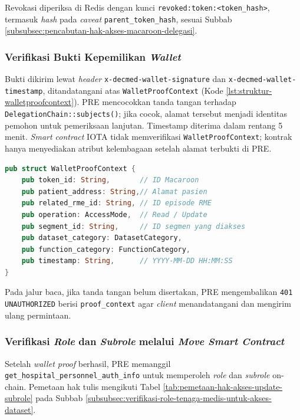 \documentclass[bahasa, 12pt, a4paper, onecolumn, oneside, final]{report}
\begin{document}
Revokasi diperiksa di Redis dengan kunci \texttt{revoked:token:<token\_hash>}, termasuk \textit{hash} pada \textit{caveat} \texttt{parent\_token\_hash}, sesuai Subbab \ref{subsubsec:pencabutan-hak-akses-macaroon-delegasi}.

\subsubsection{Verifikasi Bukti Kepemilikan \textit{Wallet}}
\label{subsec:verifikasi-bukti-kepemilikan-wallet}

Bukti dikirim lewat \textit{header} \texttt{x-decmed-wallet-signature} dan \texttt{x-decmed-wallet-timestamp}, ditandatangani atas \texttt{WalletProofContext} (Kode \ref{lst:struktur-walletproofcontext}). PRE mencocokkan tanda tangan terhadap \texttt{DelegationChain::subjects()}; jika cocok, alamat tersebut menjadi identitas pemohon untuk pemeriksaan lanjutan. Timestamp diterima dalam rentang 5 menit. \textit{Smart contract} IOTA tidak memverifikasi \texttt{WalletProofContext}; kontrak hanya menyediakan atribut kelembagaan setelah alamat terbukti di PRE.

\begin{lstlisting}[language=Rust, caption={Struktur \texttt{WalletProofContext} sebagai konteks verifikasi \textit{wallet signature}}, label={lst:struktur-walletproofcontext}]
pub struct WalletProofContext {
	pub token_id: String,       // ID Macaroon
	pub patient_address: String,// Alamat pasien
	pub related_rme_id: String, // ID episode RME
	pub operation: AccessMode,  // Read / Update
	pub segment_id: String,     // ID segmen yang diakses
	pub dataset_category: DatasetCategory,
	pub function_category: FunctionCategory,
	pub timestamp: String,		// YYYY-MM-DD HH:MM:SS
}
\end{lstlisting}

Pada jalur baca, jika tanda tangan belum disertakan, PRE mengembalikan \texttt{401 UNAUTHORIZED} berisi \texttt{proof\_context} agar \textit{client} menandatangani dan mengirim ulang permintaan.

\subsubsection{Verifikasi \textit{Role} dan \textit{Subrole} melalui \textit{Move Smart Contract}}
\label{subsec:validasi-role-subrole-move-smart-contract}

Setelah \textit{wallet proof} berhasil, PRE memanggil \texttt{get\_hospital\_personnel\_auth\_info} untuk memperoleh \textit{role} dan \textit{subrole} on-chain. Pemetaan hak tulis mengikuti Tabel \ref{tab:pemetaan-hak-akses-update-subrole} pada Subbab \ref{subsubsec:verifikasi-role-tenaga-medis-untuk-akses-dataset}.
\end{document}
